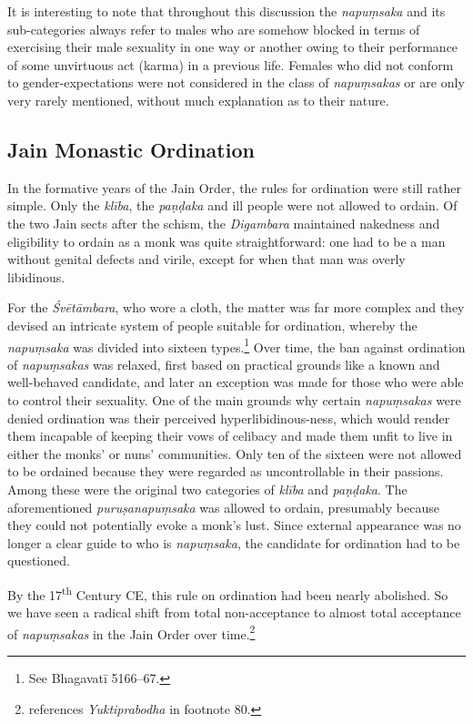 It is interesting to note that throughout this discussion the {\em napuṃsaka} and its sub-categories always refer to males who are somehow blocked in terms of exercising their male sexuality in one way or another owing to their performance of some unvirtuous act (karma) in a previous life. Females who did not conform to gender-expectations were not considered in the class of {\em napuṃsakas} or are only very rarely mentioned, without much explanation as to their nature. 

\subsection{Jain Monastic Ordination}
In the formative years of the Jain Order, the rules for ordination were still rather simple. Only the {\em klība}, the {\em paṇḍaka} and ill people were not allowed to ordain. Of the two Jain sects after the schism, the {\em Digambara} maintained nakedness and eligibility to ordain as a monk was quite straightforward: one had to be a man without genital defects and virile, except for when that man was overly libidinous. 

For the {\em Śvētāmbara}, who wore a cloth, the matter was far more complex and they devised an intricate system of people suitable for ordination, whereby the {\em napuṃsaka} was divided into sixteen types.\footnote{See Bhagavatī 5166–67.} Over time, the ban against ordination of {\em napuṃsakas} was relaxed, first based on practical grounds like a known and well-behaved candidate, and later an exception was made for those who were able to control their sexuality. One of the main grounds why certain {\em napuṃsakas} were denied ordination was their perceived hyperlibidinous-ness, which would render them incapable of keeping their vows of celibacy and made them unfit to live in either the monks' or nuns' communities. Only ten of the sixteen were not allowed to be ordained because they were regarded as uncontrollable in their passions. Among these were the original two categories of {\em klība} and {\em paṇḍaka}. The aforementioned {\em puruṣanapuṃsaka} was allowed to ordain, presumably because they could not potentially evoke a monk's lust. Since external appearance was no longer a clear guide to who is {\em napuṃsaka}, the candidate for ordination had to be questioned. 

By the 17\textsuperscript{th} Century CE, this rule on ordination had been nearly abolished. So we have seen a radical shift from total non-acceptance to almost total acceptance of {\em napuṃsakas} in the Jain Order over time.\footnote{\cite{zwilling} references {\em Yuktiprabodha} in footnote 80.}

